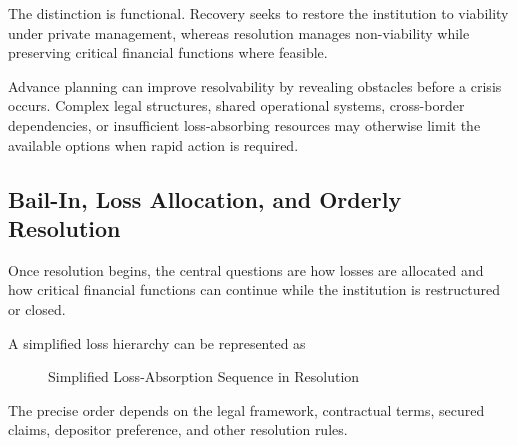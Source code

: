 The distinction is functional. Recovery seeks to restore the institution to viability under private management, whereas resolution manages non-viability while preserving critical financial functions where feasible.

Advance planning can improve resolvability by revealing obstacles before a crisis occurs. Complex legal structures, shared operational systems, cross-border dependencies, or insufficient loss-absorbing resources may otherwise limit the available options when rapid action is required.

\subsection{Bail-In, Loss Allocation, and Orderly Resolution}

Once resolution begins, the central questions are how losses are allocated and how critical financial functions can continue while the institution is restructured or closed.

A simplified loss hierarchy can be represented as

\begin{figure}[htbp]
\centering


\caption{Simplified Loss-Absorption Sequence in Resolution}
\label{fig:ch23-loss-hierarchy}

\end{figure}
The precise order depends on the legal framework, contractual terms, secured claims, depositor preference, and other resolution rules.


